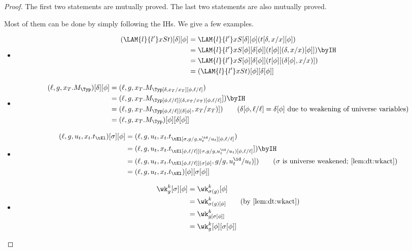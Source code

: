 \begin{proof}
  The first two statements are mutually proved. The last two statements are also
  mutually proved. %

  Most of them can be done by simply following the IHs. %
  We give a few examples.
  \begin{itemize}[label=Case]
  \item
    \begin{align*}
      (\LAM{l}{l'}x{S}t)[\delta][\phi]
      &= \LAM{l}{l'}x{S[\delta][\phi]}{(t[\delta,x/x][\phi])} \\
      &= \LAM{l}{l'}x{S[\phi][\delta[\phi]]}{(t[\phi][(\delta,x/x)[\phi]])}
      \byIH \\
      &= \LAM{l}{l'}x{S[\phi][\delta[\phi]]}{(t[\phi][(\delta[\phi],x/x)])} \\
      &= (\LAM{l}{l'}x{S}t)[\phi][\delta[\phi]]
    \end{align*}
  \item
    \begin{align*}
      (\ell,g,x_T. M_\Typ)[\delta][\phi]
      &= (\ell,g,x_T. M_\Typ[\delta,x_T/x_T][\phi,\ell/\ell]) \\
      &= (\ell,g,x_T. M_\Typ[\phi,\ell/\ell][(\delta,x_T/x_T)[\phi,\ell/\ell]])
      \byIH \\
      &= (\ell,g,x_T. M_\Typ[\phi,\ell/\ell][(\delta[\phi],x_T/x_T)])
      \tag{$\delta[\phi,\ell/\ell] = \delta[\phi]$ due to weakening of universe variables}\\
      &= (\ell,g,x_T. M_\Typ)[\phi][\delta[\phi]]
    \end{align*}
  \item
    \begin{align*}
      (\ell,g,u_t,x_t. t_\tEl)[\sigma][\phi]
      &= (\ell,g,u_t,x_t. t_\tEl[\sigma,g/g,u_t^\id/u_t][\phi,\ell/\ell]) \\
      &= (\ell,g,u_t,x_t. t_\tEl[\phi,\ell/\ell][(\sigma,g/g,u_t^\id/u_t)[\phi,\ell/\ell]])
      \byIH \\
      &= (\ell,g,u_t,x_t. t_\tEl[\phi,\ell/\ell][(\sigma[\phi],g/g,u_t^\id/u_t)])
        \tag{$\sigma$ is universe weakened; \Cref{lem:dt:wkact}} \\
      &= (\ell,g,u_t,x_t. t_\tEl)[\phi][\sigma[\phi]]
    \end{align*}
  \item
    \begin{align*}
      \wk^k_g[\sigma][\phi]
      &= \wk^k_{\sigma(g)}[\phi] \\
      &= \wk^k_{\sigma(g)[\phi]} 
      \tag{by \Cref{lem:dt:wkact}} \\
      &= \wk^k_{g[\sigma[\phi]]}  \\
      &= \wk^k_g[\phi][\sigma[\phi]] 
    \end{align*}
    

\end{itemize}
\end{proof}
